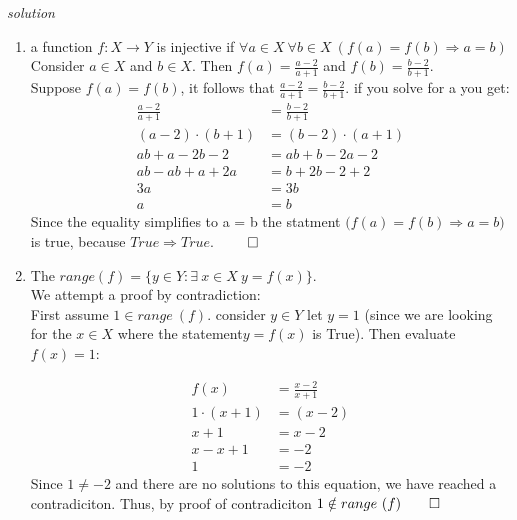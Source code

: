 \documentclass[11pt,twoside]{amsart}
\theoremstyle{definition}
\begin{document}
\emph{solution}
\begin{enumerate}[label= 1.\arabic*), itemsep=0.4cm]
  \item %
    a function $f : X \rightarrow Y$ is injective if $\forall a \in X \ \forall b \in X \ (f(a) = f(b) \Rightarrow a=b)$ \bigskip \\
    Consider $a \in X$ and $b \in X$. 
    Then $f(a) = \frac{a-2}{a+1}$ 
    and $f(b) = \frac{b-2}{b+1}.$ \\
    Suppose $f(a) = f(b)$, 
    it follows that $\frac{a-2}{a+1} = \frac{b-2}{b+1}$.
    if you solve for a you get:
    \begin{align*}
      \frac{a-2}{a+1} &= \frac{b-2}{b+1}\\ 
      (a-2)\cdot(b+1) &= (b-2)\cdot(a+1)\\
        ab + a -2b -2 &= ab + b - 2a -2 \\
     ab - ab + a + 2a &= b + 2b -2 +2 \\
                   3a &= 3b \\      
                    a &= b
\end{align*}
   Since the equality simplifies to a = b the statment 
   $\big( f(a) = f(b) \Rightarrow a = b \big)$ is true, 
     because $True \Rightarrow True$. $\qed$ 
    \newpage
  \item %
  The $range(f) = \{ y \in Y : \exists \ x\in X \ y = f(x)\}$.\\ \medskip 
  We attempt a proof by contradiction:\\
  First assume $1\in range \ (f)$. consider $y\in Y$ let $y=1
  $ (since we are looking for the $x \in X$ where the statement$y=f(x)$ is True). Then evaluate $f(x) = 1$:

  \begin{align*}
         f(x) &= \frac{x-2}{x+1} \\
1 \cdot (x+1) &= (x-2) \\
          x+1 &= x-2 \\
        x-x+1 &= -2 \\ 
            1 &= -2
  \end{align*}
    Since $1 \neq -2$ and there are no solutions to this equation, we have reached a contradiciton. Thus, by proof of contradiciton $1 \notin range \ (f) \qed$
          


\end{enumerate}
\end{document}
